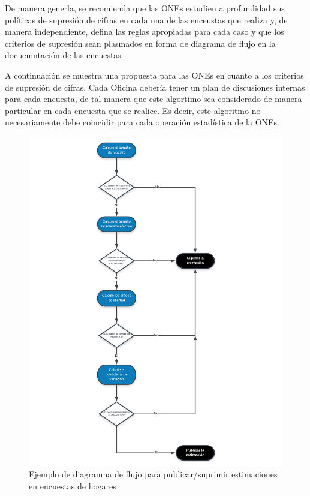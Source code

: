 De manera generla, se recomienda que las ONEs estudien a profundidad sus políticas de supresión de cifras en cada una de las enceustas que realiza y, de manera independiente, defina las reglas apropiadas para cada caso y que los criterios de supresión sean plasmados en forma de diagrama de flujo en la docuemntación de las encuestas.

A continuación se muestra una propuesta para las ONEs en cuanto a los criterios de supresión de cifras. Cada Oficina debería tener un plan de discusiones internas para cada encuesta, de tal manera que este algortimo sea considerado de manera particular en cada encuesta que se realice. Es decir, este algoritmo no necesariamente debe coincidir para cada operación estadística de la ONEs.

\begin{figure}
\centering
\includegraphics{Pics/14.pdf}
\caption{Ejemplo de diagramna de flujo para publicar/suprimir estimaciones en encuestas de hogares}
\end{figure}

